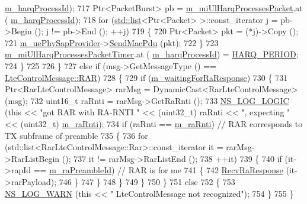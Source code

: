 \begin{DoxyCode}
      \hyperlink{classns3_1_1LteUeMac_ad7b724012bfa1d25bd750f40a66a1aaf}{m\_harqProcessId});
717           Ptr<PacketBurst> pb = \hyperlink{classns3_1_1LteUeMac_af895ce47f438d39c2753740352120c45}{m\_miUlHarqProcessesPacket}.at (
      \hyperlink{classns3_1_1LteUeMac_ad7b724012bfa1d25bd750f40a66a1aaf}{m\_harqProcessId});
718           \textcolor{keywordflow}{for} (\hyperlink{openflow-interface_8h_afd9bcfa176617760671b67580f536fa7}{std::list}<Ptr<Packet> >::const\_iterator j = pb->Begin (); j != pb->End (); ++j)
719             \{
720               Ptr<Packet> pkt = (*j)->Copy ();
721               \hyperlink{classns3_1_1LteUeMac_a3189de2e0656b4e918c1302f7f68a007}{m\_uePhySapProvider}->\hyperlink{classns3_1_1LteUePhySapProvider_a6ce4226c03154f4fb8b2b9f70e3241d4}{SendMacPdu} (pkt);
722             \}
723           \hyperlink{classns3_1_1LteUeMac_a1048d43c65abcd15c3e8623cd17b0d17}{m\_miUlHarqProcessesPacketTimer}.at (
      \hyperlink{classns3_1_1LteUeMac_ad7b724012bfa1d25bd750f40a66a1aaf}{m\_harqProcessId}) = \hyperlink{lte-common_8h_a275321ee206f130c3ddc81fcdaa13cfd}{HARQ\_PERIOD};          
724         \}
725 
726     \}
727   \textcolor{keywordflow}{else} \textcolor{keywordflow}{if} (msg->GetMessageType () == \hyperlink{classns3_1_1LteControlMessage_a9f9798d5aa8ad40f6432285b4b06135ba32e0d29cd217b256852ae7e843c932ed}{LteControlMessage::RAR})
728     \{
729       \textcolor{keywordflow}{if} (\hyperlink{classns3_1_1LteUeMac_ad31e6d5654f49c13d6f5614922e97288}{m\_waitingForRaResponse})
730         \{
731           Ptr<RarLteControlMessage> rarMsg = DynamicCast<RarLteControlMessage> (msg);
732           uint16\_t raRnti = rarMsg->GetRaRnti ();
733           \hyperlink{group__logging_ga88acd260151caf2db9c0fc84997f45ce}{NS\_LOG\_LOGIC} (\textcolor{keyword}{this} << \textcolor{stringliteral}{"got RAR with RA-RNTI "} << (uint32\_t) raRnti << \textcolor{stringliteral}{", expecting "} 
      << (uint32\_t) \hyperlink{classns3_1_1LteUeMac_a00052ade9b3ba115e57d9cb491a4b06a}{m\_raRnti});
734           \textcolor{keywordflow}{if} (raRnti == \hyperlink{classns3_1_1LteUeMac_a00052ade9b3ba115e57d9cb491a4b06a}{m\_raRnti}) \textcolor{comment}{// RAR corresponds to TX subframe of preamble}
735             \{
736               \textcolor{keywordflow}{for} (std::list<RarLteControlMessage::Rar>::const\_iterator it = rarMsg->RarListBegin ();
737                    it != rarMsg->RarListEnd ();
738                    ++it)
739                 \{
740                   \textcolor{keywordflow}{if} (it->rapId == \hyperlink{classns3_1_1LteUeMac_a80808b971b1fb38d1d41ef34811a0252}{m\_raPreambleId}) \textcolor{comment}{// RAR is for me}
741                     \{
742                       \hyperlink{classns3_1_1LteUeMac_a77ec93865861de0a63e8ec82c129d5ef}{RecvRaResponse} (it->rarPayload);
746                     \}
747                 \}
748             \}
749         \}
750     \}
751   \textcolor{keywordflow}{else}
752     \{
753       \hyperlink{group__logging_gade7208b4009cdf0e25783cd26766f559}{NS\_LOG\_WARN} (\textcolor{keyword}{this} << \textcolor{stringliteral}{" LteControlMessage not recognized"});
754     \}
755 \}
\end{DoxyCode}


